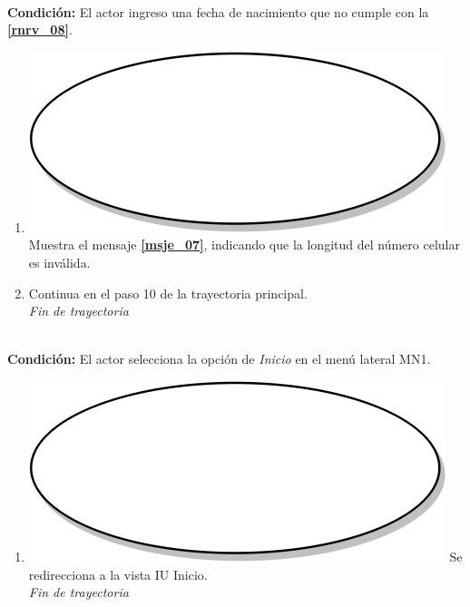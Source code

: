 \textbf{} \\
\textbf{Condición:} El actor ingreso una fecha de nacimiento que no cumple con la \textbf{\ref{rnrv_08}}.\\
 \begin{enumerate}[label=J\arabic*]
    \item {\includegraphics[scale=.05]{Capitulo3/img/proceso.png} Muestra el mensaje \textbf{\ref{msje_07}}, indicando que la longitud del número celular es inválida.}
    \item {Continua en el paso 10 de la trayectoria principal.} \\
    \textit{Fin de trayectoria} \\    
\end{enumerate}



\textbf{} \\
\textbf{Condición:} El actor selecciona la opción de \textit{Inicio} en el menú lateral MN1. \\
 \begin{enumerate}[label=L\arabic*]
    \item {\includegraphics[scale=.05]{Capitulo3/img/proceso.png} Se redirecciona a la vista IU Inicio.} \\
    \textit{Fin de trayectoria} \\
\end{enumerate}

